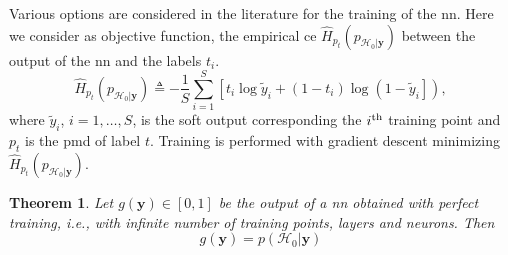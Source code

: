 \documentclass[conference,draftcls,onecolumn]{IEEEtran}
\newcommand{\hatcross}[2]{\hat{H}_{#1}(#2)}
\newcommand{\gy}{g(\bm y)}
\newtheorem{theorem}{Theorem}
\begin{document}
Various options are considered in the literature for the training of the \ac{nn}. Here we consider as objective function, the empirical \ac{ce} $\hatcross{p_t}{p_{\mathcal{H}_0|\bm y}}$ between the output of the \ac{nn} and the labels $t_i$. 
\begin{equation}\label{eq:ce}
\hatcross{p_t}{p_{\mathcal{H}_0|\bm y}} \triangleq -\frac{1}{S} \sum_{i=1}^{S}\left[t_i\log \tilde{y}_i +\left(1-t_i\right)\log\left(1-\tilde{y}_i\right] \right),
\end{equation}
where $\tilde{y}_i$, $i=1, \ldots, S$, is the soft output corresponding the $i^{\rm th}$  training point and $p_t$ is the \ac{pmd} of label $t$. Training is performed with gradient descent minimizing $\hatcross{p_t}{p_{\mathcal{H}_0|\bm y}}$.
\begin{theorem}
Let $\gy \in [0,1]$ be the output of a \ac{nn} obtained with perfect training, i.e., with infinite number of training points, layers and neurons. Then 
\begin{equation}
	\gy = p(\mathcal{H}_0|\bm y)	
\end{equation}
\end{theorem}
\end{document}

